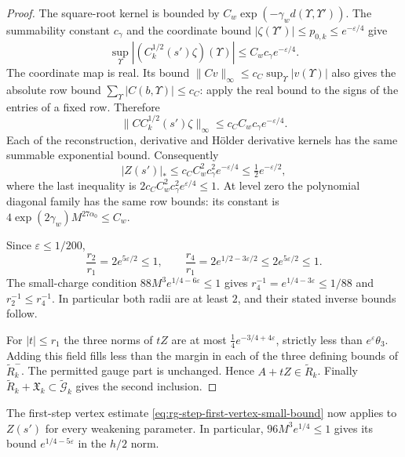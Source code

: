 \documentclass[11pt,letterpaper,reqno]{amsart}
\begin{document}
\begin{proof}
The square-root kernel is bounded by
$C_w\exp(-\gamma_w d(\Upsilon,\Upsilon'))$.
The summability constant $c_\gamma$ and
the coordinate bound $|\zeta(\Upsilon')|\le p_{0,k}
\le e^{-\varepsilon/4}$ give
\[
 \sup_\Upsilon|(C_k^{1/2}(s')\zeta)(\Upsilon)|
                                      \le C_wc_\gamma e^{-\varepsilon/4}.
\]
The coordinate map is real. Its bound
$\|Cv\|_\infty\le c_C\sup_\Upsilon|v(\Upsilon)|$
also gives the absolute row bound
$\sum_\Upsilon|C(b,\Upsilon)|\le c_C$:
apply the real bound to the signs of the entries of a fixed
row. Therefore
\[
 \|CC_k^{1/2}(s')\zeta\|_\infty
                                  \le c_CC_wc_\gamma e^{-\varepsilon/4}.
\]
Each of the reconstruction, derivative and H\"older derivative
kernels has the same summable exponential bound. Consequently
\[
 |Z(s')|_*\le c_CC_w^2c_\gamma^2 e^{-\varepsilon/4}
                                          \le\tfrac12 e^{-\varepsilon/2},
\]
where the last inequality is
$2c_CC_w^2c_\gamma^2e^{\varepsilon/4}\le1$.
At level zero the polynomial diagonal family has the same
row bounds: its constant is
$4\exp(2\gamma_w)M^{27\alpha_0}\le C_w$.

Since $\varepsilon\le1/200$,
\[
 \frac{r_2}{r_1}=2e^{5\varepsilon/2}\le1,\qquad
 \frac{r_4}{r_1}=2e^{1/2-3\varepsilon/2}
                                      \le2e^{5\varepsilon/2}\le1.
\]
The small-charge condition
$88M^3e^{1/4-6\varepsilon}\le1$ gives
$r_4^{-1}=e^{1/4-3\varepsilon}\le1/88$ and
$r_2^{-1}\le r_4^{-1}$.
In particular both radii are at least $2$, and their stated
inverse bounds follow.

For $|t|\le r_1$ the three norms of $tZ$ are at most
$\frac14e^{-3/4+4\varepsilon}$, strictly less than
$e^\varepsilon\theta_3$. Adding this field fills less than the
margin in each of the three defining bounds of
$\widetilde R_k^-$. The permitted gauge part is unchanged.
Hence $A+tZ\in\widetilde R_k$.
Finally $\widetilde R_k+\mathfrak X_k
\subset\widetilde{\mathcal G}_k$ gives the second inclusion.
\end{proof}
The first-step vertex estimate
\eqref{eq:rg-step-first-vertex-small-bound} now applies to
$Z(s')$ for every weakening parameter. In particular,
$96M^3e^{1/4}\le1$ gives its bound
$e^{1/4-5\varepsilon}$ in the $h/2$ norm.
\end{document}
